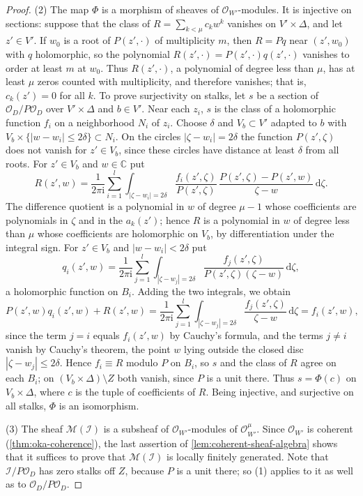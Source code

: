 \begin{proof}
(2) The map $\Phi$ is a morphism of sheaves of $\mathcal O_{W'}$-modules. It is injective on sections: suppose that the class of $R=\sum_{k<\mu}c_kw^k$ vanishes on $V'\times\Delta$, and let $z'\in V'$. If $w_0$ is a root of $P(z',\cdot)$ of multiplicity $m$, then $R=Pq$ near $(z',w_0)$ with $q$ holomorphic, so the polynomial $R(z',\cdot)=P(z',\cdot)q(z',\cdot)$ vanishes to order at least $m$ at $w_0$. Thus $R(z',\cdot)$, a polynomial of degree less than $\mu$, has at least $\mu$ zeros counted with multiplicity, and therefore vanishes; that is, $c_k(z')=0$ for all $k$. To prove surjectivity on stalks, let $s$ be a section of $\mathcal O_D/P\mathcal O_D$ over $V'\times\Delta$ and $b\in V'$. Near each $z_i$, $s$ is the class of a holomorphic function $f_i$ on a neighborhood $N_i$ of $z_i$. Choose $\delta$ and $V_b\subset V'$ adapted to $b$ with $V_b\times\{|w-w_i|\leq2\delta\}\subset N_i$. On the circles $|\zeta-w_i|=2\delta$ the function $P(z',\zeta)$ does not vanish for $z'\in V_b$, since these circles have distance at least $\delta$ from all roots. For $z'\in V_b$ and $w\in\mathbb C$ put
\[
 R(z',w)=\frac1{2\pi\mathrm i}\sum_{i=1}^l\int_{|\zeta-w_i|=2\delta}
 \frac{f_i(z',\zeta)}{P(z',\zeta)}\,\frac{P(z',\zeta)-P(z',w)}{\zeta-w}\,\mathrm d\zeta.
\]
The difference quotient is a polynomial in $w$ of degree $\mu-1$ whose coefficients are polynomials in $\zeta$ and in the $a_k(z')$; hence $R$ is a polynomial in $w$ of degree less than $\mu$ whose coefficients are holomorphic on $V_b$, by differentiation under the integral sign. For $z'\in V_b$ and $|w-w_i|<2\delta$ put
\[
 q_i(z',w)=\frac1{2\pi\mathrm i}\sum_{j=1}^l\int_{|\zeta-w_j|=2\delta}\frac{f_j(z',\zeta)}{P(z',\zeta)(\zeta-w)}\,\mathrm d\zeta,
\]
a holomorphic function on $B_i$. Adding the two integrals, we obtain
\[
 P(z',w)q_i(z',w)+R(z',w)=\frac1{2\pi\mathrm i}\sum_{j=1}^l\int_{|\zeta-w_j|=2\delta}\frac{f_j(z',\zeta)}{\zeta-w}\,\mathrm d\zeta=f_i(z',w),
\]
since the term $j=i$ equals $f_i(z',w)$ by Cauchy's formula, and the terms $j\neq i$ vanish by Cauchy's theorem, the point $w$ lying outside the closed disc $|\zeta-w_j|\leq2\delta$. Hence $f_i\equiv R$ modulo $P$ on $B_i$, so $s$ and the class of $R$ agree on each $B_i$; on $(V_b\times\Delta)\setminus Z$ both vanish, since $P$ is a unit there. Thus $s=\Phi(c)$ on $V_b\times\Delta$, where $c$ is the tuple of coefficients of $R$. Being injective, and surjective on all stalks, $\Phi$ is an isomorphism.

(3) The sheaf $\mathcal M(\mathcal I)$ is a subsheaf of $\mathcal O_{W'}$-modules of $\mathcal O_{W'}^\mu$. Since $\mathcal O_{W'}$ is coherent (\cref{thm:oka-coherence}), the last assertion of \cref{lem:coherent-sheaf-algebra} shows that it suffices to prove that $\mathcal M(\mathcal I)$ is locally finitely generated. Note that $\mathcal I/P\mathcal O_D$ has zero stalks off $Z$, because $P$ is a unit there; so (1) applies to it as well as to $\mathcal O_D/P\mathcal O_D$.


\end{proof}
